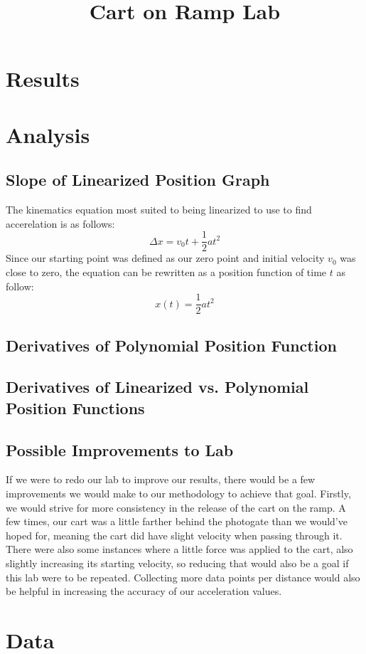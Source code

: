 \documentclass{article}
\title{Cart on Ramp Lab}
\begin{document}
\section{Results}
\section{Analysis}
\subsection{Slope of Linearized Position Graph}
The kinematics equation most suited to being linearized to use to find accerelation is as follows:
\[\Delta x = v_0t + \frac{1}{2}at^2\]
Since our starting point was defined as our zero point and initial velocity $v_0$ was close to zero, the equation can be rewritten as a position function of time $t$ as follow:
\[x(t) = \frac{1}{2}at^2\]


\subsection{Derivatives of Polynomial Position Function}
\subsection{Derivatives of Linearized vs. Polynomial Position Functions}

\subsection{Possible Improvements to Lab}
If we were to redo our lab to improve our results, there would be a few improvements we would make to our methodology to achieve that goal. Firstly, we would strive for more consistency in the release of the cart on the ramp. A few times, our cart was a little farther behind the photogate than we would've hoped for, meaning the cart did have slight velocity when passing through it. There were also some instances where a little force was applied to the cart, also slightly increasing its starting velocity, so reducing that would also be a goal if this lab were to be repeated. Collecting more data points per distance would also be helpful in increasing the accuracy of our acceleration values.


\appendix
\section{Data}
\end{document}
